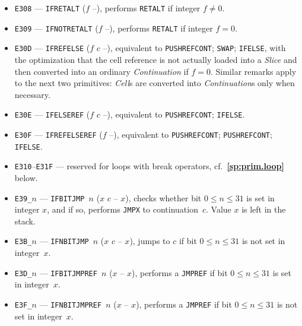 \documentclass[12pt,oneside]{article}
\def\refpoint#1{{\rm\textbf{\ref{#1}}}}
\let\ptref=\refpoint
\begin{document}
\begin{itemize}
\item {\tt E308} --- {\tt IFRETALT} ($f$ --), performs {\tt RETALT} if integer $f\neq0$.
\item {\tt E309} --- {\tt IFNOTRETALT} ($f$ --), performs {\tt RETALT} if integer $f=0$.
\item {\tt E30D} --- {\tt IFREFELSE} ($f$ $c$ --), equivalent to {\tt PUSHREFCONT}; {\tt SWAP}; {\tt IFELSE}, with the optimization that the cell reference is not actually loaded into a {\em Slice} and then converted into an ordinary {\em Continuation\/} if $f=0$. Similar remarks apply to the next two primitives: {\em Cell\/}s are converted into {\em Continuation\/}s only when necessary.
\item {\tt E30E} --- {\tt IFELSEREF} ($f$ $c$ --), equivalent to {\tt PUSHREFCONT}; {\tt IFELSE}.
\item {\tt E30F} --- {\tt IFREFELSEREF} ($f$ --), equivalent to {\tt PUSHREFCONT}; {\tt PUSHREFCONT}; {\tt IFELSE}.
\item {\tt E310}--{\tt E31F} --- reserved for loops with break operators, cf.~\ptref{sp:prim.loop} below.
\item {\tt E39\_$n$} --- {\tt IFBITJMP $n$} ($x$ $c$ -- $x$), checks whether bit $0\leq n\leq 31$ is set in integer $x$, and if so, performs {\tt JMPX} to continuation~$c$. Value $x$ is left in the stack.
\item {\tt E3B\_$n$} --- {\tt IFNBITJMP $n$} ($x$ $c$ -- $x$), jumps to $c$ if bit $0\leq n\leq 31$ is not set in integer~$x$.
\item {\tt E3D\_$n$} --- {\tt IFBITJMPREF $n$} ($x$ -- $x$), performs a {\tt JMPREF} if bit $0\leq n\leq 31$ is set in integer~$x$.
\item {\tt E3F\_$n$} --- {\tt IFNBITJMPREF $n$} ($x$ -- $x$), performs a {\tt JMPREF} if bit $0\leq n\leq 31$ is not set in integer~$x$.
\end{itemize}
\end{document}
